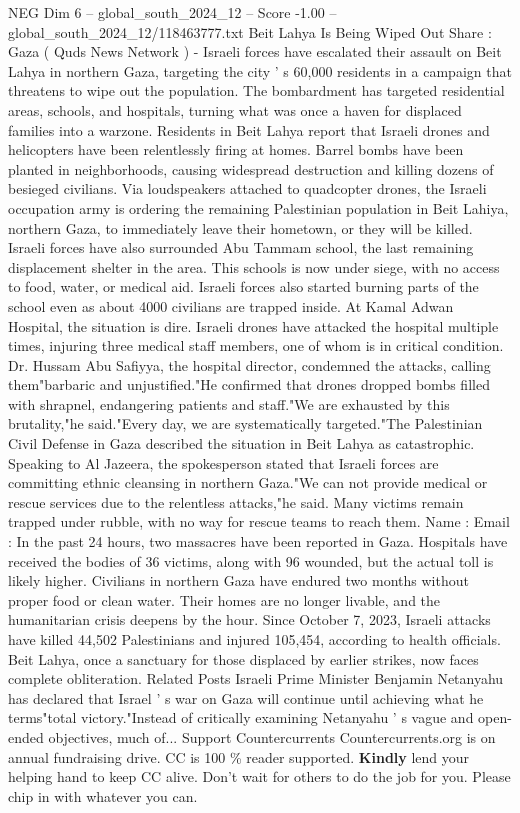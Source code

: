 \begin{textsample}{NEG Dim 6 – global\_south\_2024\_12 – Score -1.00 – global\_south\_2024\_12/118463777.txt}  \label{ex:f6_neg_021}
Beit Lahya Is Being Wiped Out Share : Gaza ( Quds News Network ) - Israeli forces have escalated their assault on Beit Lahya in northern Gaza, targeting the city ' s 60,000 residents in a campaign that threatens to wipe out the population.
The bombardment has targeted residential areas, schools, and hospitals, turning what was once a haven for displaced families into a warzone.
Residents in Beit Lahya report that Israeli drones and helicopters have been relentlessly firing at homes.
Barrel bombs have been planted in neighborhoods, causing widespread destruction and killing dozens of besieged civilians.
Via loudspeakers attached to quadcopter drones, the Israeli occupation army is ordering the remaining Palestinian population in Beit Lahiya, northern Gaza, to immediately leave their hometown, or they will be killed.
Israeli forces have also surrounded Abu Tammam school, the last remaining displacement shelter in the area.
This schools is now under siege, with no access to food, water, or medical aid.
Israeli forces also started burning parts of the school even as about 4000 civilians are trapped inside.
At Kamal Adwan Hospital, the situation is dire.
Israeli drones have attacked the hospital multiple times, injuring three medical staff members, one of whom is in critical condition.
Dr.
Hussam Abu Safiyya, the hospital director, condemned the attacks, calling them"barbaric and unjustified."He confirmed that drones dropped bombs filled with shrapnel, endangering patients and staff."We are exhausted by this brutality,"he said."Every day, we are systematically targeted."The Palestinian Civil Defense in Gaza described the situation in Beit Lahya as catastrophic.
Speaking to Al Jazeera, the spokesperson stated that Israeli forces are committing ethnic cleansing in northern Gaza."We can not provide medical or rescue services due to the relentless attacks,"he said.
Many victims remain trapped under rubble, with no way for rescue teams to reach them.
Name : Email : In the past 24 hours, two massacres have been reported in Gaza.
Hospitals have received the bodies of 36 victims, along with 96 wounded, but the actual toll is likely higher.
Civilians in northern Gaza have endured two months without proper food or clean water.
Their homes are no longer livable, and the humanitarian crisis deepens by the hour.
Since October 7, 2023, Israeli attacks have killed 44,502 Palestinians and injured 105,454, according to health officials.
Beit Lahya, once a sanctuary for those displaced by earlier strikes, now faces complete obliteration.
Related Posts Israeli Prime Minister Benjamin Netanyahu has declared that Israel ' s war on Gaza will continue until achieving what he terms"total victory."Instead of critically examining Netanyahu ' s vague and open-ended objectives, much of...
Support Countercurrents Countercurrents.org is on annual fundraising drive.
CC is 100 \% reader supported. \textbf{Kindly} lend your helping hand to keep CC alive.
Don't wait for others to do the job for you.
Please chip in with whatever you can.

\end{textsample}
